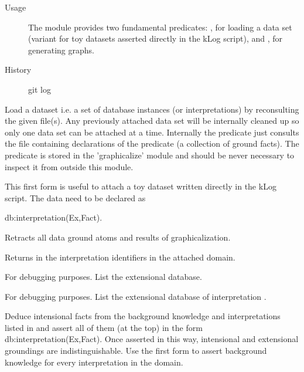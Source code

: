 \begin{description}
    \item[Usage] 
The module provides two fundamental predicates: , for
loading a data set (variant  for toy datasets asserted
directly in the kLog script), and ,  for
generating graphs.
    \item[History] 
git log
\end{description}

\vspace{0.7cm}

\begin{description}
Load a dataset i.e. a set of database instances (or interpretations)
by reconsulting the given file(s). Any previously attached data set
will be internally cleaned up so only one data set can be attached
at a time. Internally the predicate just consults the file
containing declarations of the predicate  (a
collection of ground facts). The predicate is stored in the
'graphicalize' module and should be never necessary to inspect it
from outside this module.

This first form is useful to attach a toy dataset written directly in
the kLog script. The data need to be declared as

\begin{code}
db:interpretation(Ex,Fact).
\end{code}

Retracts all data ground atoms and results of graphicalization.

Returns in  the interpretation identifiers in the attached domain.

For debugging purposes. List the extensional database.

For debugging purposes. List the extensional database of interpretation .

Deduce intensional facts from the background knowledge and
interpretations listed in  and assert all of them (at the
top) in the form db:interpretation(Ex,Fact). Once asserted in this
way, intensional and extensional groundings are
indistinguishable. Use the first form to assert background knowledge
for every interpretation in the domain.


\end{description}

